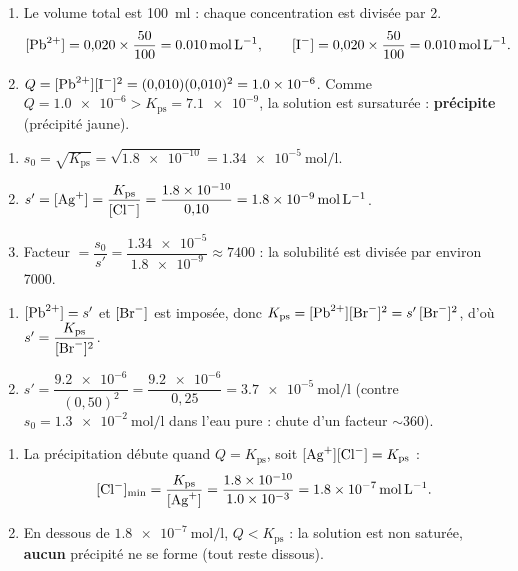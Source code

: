 \documentclass[11pt,a4paper]{article}
\begin{document}
\begin{corrige}
\begin{enumerate}[label=\alph*)]
  \item Le volume total est \qty{100}{\milli\litre} : chaque concentration est divisée par 2.
    \[ [\ce{Pb^{2+}}] = 0{,}020\times\dfrac{50}{100} = \qty{0.010}{\mole\per\litre}, \qquad
       [\ce{I-}] = 0{,}020\times\dfrac{50}{100} = \qty{0.010}{\mole\per\litre}. \]
  \item $Q = [\ce{Pb^{2+}}][\ce{I-}]^{2} = (0{,}010)(0{,}010)^{2} = \num{1.0e-6}$. Comme
        $Q=\num{1.0e-6} > K_{\mathrm{ps}}=\num{7.1e-9}$, la solution est sursaturée : \textbf{
        précipite} (précipité jaune).
\end{enumerate}
\end{corrige}

\begin{corrige}
\begin{enumerate}[label=\alph*)]
  \item $s_0 = \sqrt{K_{\mathrm{ps}}} = \sqrt{\num{1.8e-10}} = \qty{1.34e-5}{\mole\per\litre}$.
  \item $s' = [\ce{Ag+}] = \dfrac{K_{\mathrm{ps}}}{[\ce{Cl-}]} = \dfrac{\num{1.8e-10}}{0{,}10}
           = \qty{1.8e-9}{\mole\per\litre}$.
  \item Facteur $= \dfrac{s_0}{s'} = \dfrac{\num{1.34e-5}}{\num{1.8e-9}} \approx 7400$ : la solubilité
        est divisée par environ \num{7000}.
\end{enumerate}
\end{corrige}

\begin{corrige}
\begin{enumerate}[label=\alph*)]
  \item $[\ce{Pb^{2+}}]=s'$ et $[\ce{Br-}]$ est imposée, donc
        $K_{\mathrm{ps}}=[\ce{Pb^{2+}}][\ce{Br-}]^{2}=s'\,[\ce{Br-}]^{2}$, d'où
        $s'=\dfrac{K_{\mathrm{ps}}}{[\ce{Br-}]^{2}}$.
  \item $s' = \dfrac{\num{9.2e-6}}{(0{,}50)^{2}} = \dfrac{\num{9.2e-6}}{0{,}25}
           = \qty{3.7e-5}{\mole\per\litre}$ (contre $s_0=\qty{1.3e-2}{\mole\per\litre}$ dans l'eau pure :
        chute d'un facteur $\sim 360$).
\end{enumerate}
\end{corrige}

\begin{corrige}
\begin{enumerate}[label=\alph*)]
  \item La précipitation débute quand $Q=K_{\mathrm{ps}}$, soit $[\ce{Ag+}][\ce{Cl-}]=K_{\mathrm{ps}}$ :
    \[ [\ce{Cl-}]_{\min} = \dfrac{K_{\mathrm{ps}}}{[\ce{Ag+}]} = \dfrac{\num{1.8e-10}}{\num{1.0e-3}}
       = \qty{1.8e-7}{\mole\per\litre}. \]
  \item En dessous de $\qty{1.8e-7}{\mole\per\litre}$, $Q<K_{\mathrm{ps}}$ : la solution est non
        saturée, \textbf{aucun} précipité ne se forme (tout reste dissous).
\end{enumerate}
\end{corrige}
\end{document}
